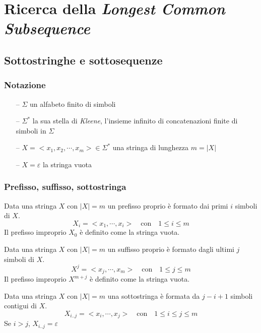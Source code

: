\section{Ricerca della \emph{Longest Common Subsequence}}

\subsection{Sottostringhe e sottosequenze}

\subsubsection{Notazione}

\begin{itemize}
    \item[--] $\Sigma$ un alfabeto finito di simboli
    \item[--] $\Sigma^{*}$ la sua stella di \emph{Kleene}, l'insieme infinito di concatenazioni finite di simboli in $\Sigma$
    \item[--] $X = < x_1, x_2, \cdots, x_m > \in \Sigma^{*}$ una stringa di lunghezza $m = |X|$
    \item[--] $X = \varepsilon$ la stringa vuota
\end{itemize}

\subsubsection{Prefisso, suffisso, sottostringa}

\begin{definition}[Prefisso]
    Data una stringa $X$ con $|X|=m$ 
    un prefisso proprio
    è formato dai primi $i$ simboli di $X$.
    \[
        {X_i = < x_1, \cdots, x_i >}
        \quad \text{con} \quad
        1 \leq i \leq m
    \]
    Il prefisso improprio $X_0$ è definito come la stringa vuota.
    \label{def:prefisso}
\end{definition}

\begin{definition}[Suffisso]
    Data una stringa $X$ con $|X|=m$ 
    un suffisso proprio
    è formato dagli ultimi $j$ simboli di $X$.
    \[
        {X^j = < x_j, \cdots, x_m >}
        \quad \text{con} \quad
        1 \leq j \leq m
    \]
    Il prefisso improprio $X^{m+j}$ è definito come la stringa vuota.
    \label{def:suffisso}
\end{definition}

\begin{definition}[Sottostringa]
    Data una stringa $X$ con $|X|=m$ 
    una sottostringa
    è formata da $j-i+1$ simboli contigui di $X$.
    \[
        X_{i..j} = < x_i, \cdots, x_j >
        \quad \text{con} \quad
        1 \leq i \leq j \leq m
    \]
    Se $i>j$, $X_{i..j}=\varepsilon$
    \label{def:sottostringa}
\end{definition}

